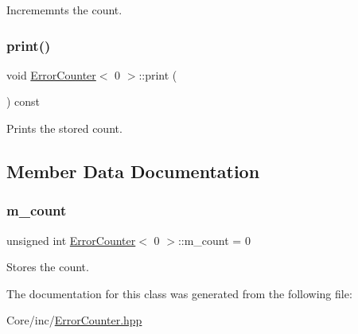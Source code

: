 Incrememnts the count. 

\mbox{\label{class_error_counter_3_010_01_4_a243e60fd839d5dc2b866adc3f6713cb7}} 
\subsubsection{\texorpdfstring{print()}{print()}}
{\footnotesize\ttfamily void \hyperlink{class_error_counter}{Error\+Counter}$<$ 0 $>$\+::print (\begin{DoxyParamCaption}{ }\end{DoxyParamCaption}) const\hspace{0.3cm}{\ttfamily [inline]}}



Prints the stored count. 



\subsection{Member Data Documentation}
\mbox{\label{class_error_counter_3_010_01_4_a463da41b6db10ef23b59ff7e6a372a8e}} 
\subsubsection{\texorpdfstring{m\+\_\+count}{m\_count}}
{\footnotesize\ttfamily unsigned int \hyperlink{class_error_counter}{Error\+Counter}$<$ 0 $>$\+::m\+\_\+count = 0\hspace{0.3cm}{\ttfamily [private]}}



Stores the count. 



The documentation for this class was generated from the following file\+:\begin{DoxyCompactItemize}
\item 
Core/inc/\hyperlink{_error_counter_8hpp}{Error\+Counter.\+hpp}\end{DoxyCompactItemize}
